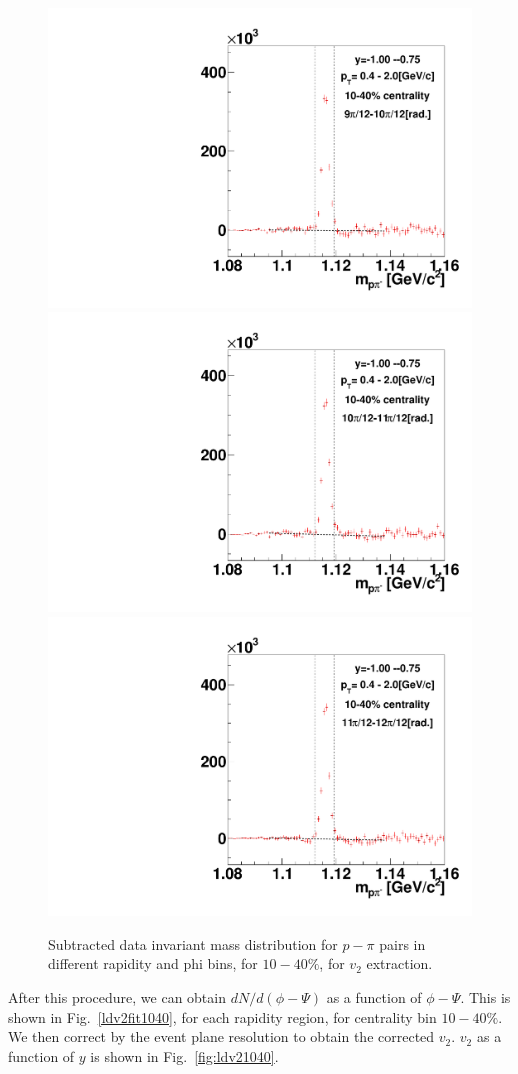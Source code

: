 \begin{figure}[h]
\includegraphics[width=0.14\linewidth]{chapterX/fig/ld_v2_sig/kf_ptslice0_cent1_ld_flow_phi10_rap5.pdf}
\includegraphics[width=0.14\linewidth]{chapterX/fig/ld_v2_sig/kf_ptslice0_cent1_ld_flow_phi11_rap5.pdf}
\includegraphics[width=0.14\linewidth]{chapterX/fig/ld_v2_sig/kf_ptslice0_cent1_ld_flow_phi12_rap5.pdf}


\caption{Subtracted data invariant mass distribution for $p-\pi$ pairs in different rapidity and phi bins, for $10-40\%$, for $v_2$ extraction.}
\label{ld_v2_sig}
\end{figure}



After this procedure, we can obtain $dN/d(\phi-\Psi)$ as a function of $\phi-\Psi$. This is shown in Fig.~\ref{ldv2fit1040}, for each rapidity region, for centrality bin $10-40\%$. We then correct by the event plane resolution to obtain the corrected $v_{2}$. $v_{2}$ as a function of $y$ is shown in Fig.~\ref{fig:ldv21040}. 

